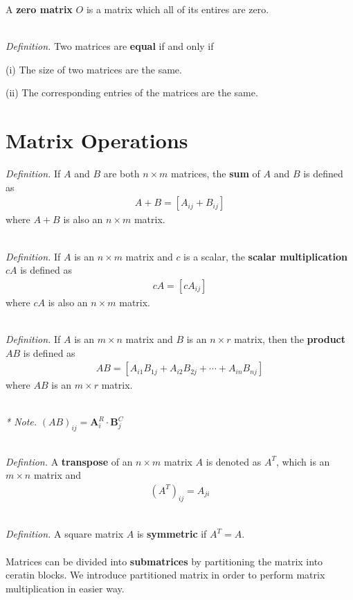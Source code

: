 \noindent A \textbf{zero matrix} $O$ is a matrix which all of its entires are zero.

\noindent \\ \textit{Definition.} Two matrices are \textbf{equal} if and only if

(i) The size of two matrices are the same.

(ii) The corresponding entries of the matrices are the same.

\section{Matrix Operations}

\textit{Definition.} If $A$ and $B$ are both $n \times m$ matrices, the \textbf{sum} of $A$ and $B$ is defined as
\begin{align*}
A + B = [A_{ij} + B_{ij}]
\end{align*} where $A+B$ is also an $n \times m$ matrix.

\noindent \\ \textit{Definition.} If $A$ is an $n \times m$ matrix and $c$ is a scalar, the \textbf{scalar multiplication} $cA$ is defined as
\begin{align*}
cA = [cA_{ij}]
\end{align*} where $cA$ is also an $n \times m$ matrix.

\noindent \\ \textit{Definition.} If $A$ is an $m \times n$ matrix and $B$ is an $n \times r$ matrix, then the \textbf{product} $AB$ is defined as
\begin{align*}
AB = [A_{i1}B_{1j} + A_{i2}B_{2j} + \cdots + A_{in}B_{nj}]
\end{align*} where $AB$ is an $m \times r$ matrix.

\noindent \\ \textit{* Note.} $(AB)_{ij} = \textbf{A}^{R}_i \cdot \textbf{B}^{C}_j$

\noindent \\ \textit{Defintion.} A \textbf{transpose} of an $n \times m$ matrix $A$ is denoted as $A^{T}$, which is an $m \times n$ matrix and
\begin{align*}
(A^{T})_{ij} = A_{ji}
\end{align*}

\noindent \\ \textit{Definition.} A square matrix $A$ is \textbf{symmetric} if $A^{T} = A$. \\


\noindent \\ Matrices can be divided into \textbf{submatrices} by partitioning the matrix into ceratin blocks. We introduce partitioned matrix in order to perform matrix multiplication in easier way.

